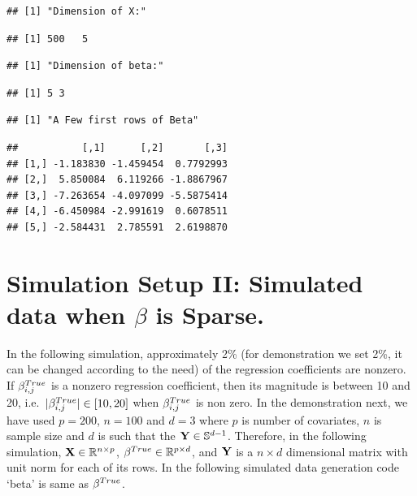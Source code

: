 \documentclass[
]{article}
\begin{document}
\begin{verbatim}
## [1] "Dimension of X:"
\end{verbatim}

\begin{verbatim}
## [1] 500   5
\end{verbatim}

\begin{verbatim}
## [1] "Dimension of beta:"
\end{verbatim}

\begin{verbatim}
## [1] 5 3
\end{verbatim}

\begin{verbatim}
## [1] "A Few first rows of Beta"
\end{verbatim}

\begin{verbatim}
##           [,1]      [,2]       [,3]
## [1,] -1.183830 -1.459454  0.7792993
## [2,]  5.850084  6.119266 -1.8867967
## [3,] -7.263654 -4.097099 -5.5875414
## [4,] -6.450984 -2.991619  0.6078511
## [5,] -2.584431  2.785591  2.6198870
\end{verbatim}

\hypertarget{simulation-setup-ii-simulated-data-when-beta-is-sparse.}{%
\section{\texorpdfstring{Simulation Setup II: Simulated data when
\(\beta\) is
Sparse.}{Simulation Setup II: Simulated data when \textbackslash beta is Sparse.}}\label{simulation-setup-ii-simulated-data-when-beta-is-sparse.}}

In the following simulation, approximately 2\% (for demonstration we set
2\%, it can be changed according to the need) of the regression
coefficients are nonzero. If \(\beta^{\tiny{True}}_{i,j}\) is a nonzero
regression coefficient, then its magnitude is between 10 and 20,
i.e.~\(\vert \beta^{\tiny{True}}_{i, j} \vert \in [10,20]\) when
\(\beta^{\tiny{True}}_{i, j}\) is non zero. In the demonstration next,
we have used \(p=200\), \(n=100\) and \(d=3\) where \(p\) is number of
covariates, \(n\) is sample size and \(d\) is such that the
\({\bf Y} \in \mathbb{S}^{d-1}\). Therefore, in the following
simulation, \({\bf X} \in \mathbb{R}^{n\times p}\),
\(\beta^{\tiny{True}}\in {\mathbb{R}}^{p\times d}\), and \({\bf Y}\) is
a \(n\times d\) dimensional matrix with unit norm for each of its rows.
In the following simulated data generation code `beta' is same as
\(\beta^{\tiny{True}}\).
\end{document}
